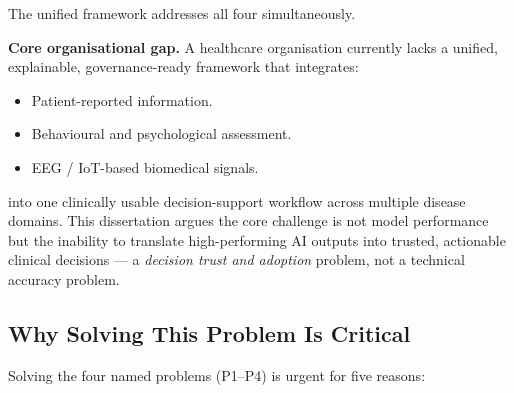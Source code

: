\noindent The unified framework addresses all four simultaneously.

\noindent\textbf{Core organisational gap.} A healthcare organisation currently lacks a unified, explainable, governance-ready framework that integrates:
\begin{itemize}[leftmargin=*, itemsep=2pt]
    \item Patient-reported information.
    \item Behavioural and psychological assessment.
    \item EEG / IoT-based biomedical signals.
\end{itemize}
\noindent into one clinically usable decision-support workflow across multiple disease domains. This dissertation argues the core challenge is not model performance but the inability to translate high-performing AI outputs into trusted, actionable clinical decisions --- a \emph{decision trust and adoption} problem, not a technical accuracy problem.

\subsection{Why Solving This Problem Is Critical}
\label{sec:why_critical}

Solving the four named problems (P1--P4) is urgent for five reasons:

